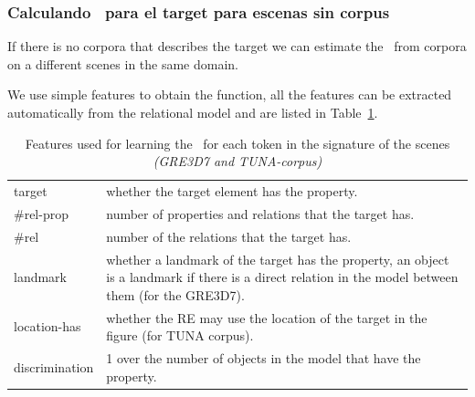 \subsubsection{Calculando \puse\ para el target para escenas sin corpus } \label{subsec:learning}

If there is no corpora that describes the target we can estimate the
\puse~from corpora on a different scenes in the same domain.

We use simple features to obtain the function, all the features can be
extracted automatically from the relational model and are listed in
Table~\ref{features}.

\begin{small}
\begin{table}[h!]
\begin{center}
\begin{tabular}{|l|p{10cm}|}
\hline
target & whether the target element has the property. \\
\#rel-prop & number of properties and relations that the target has.\\
\#rel & number of the relations that the target has. \\
landmark & whether a landmark of the target has the property, an object is a landmark if there is a direct relation in the model 
between them (for the GRE3D7).\\
location-has & whether the RE may use the location of the target in the figure (for TUNA corpus).\\
discrimination & 1 over the number of objects in the model that have the property.  \\
\hline
\end{tabular}
\caption{Features used for learning the \puse~for each token in the signature of the scenes \textit{(GRE3D7 and TUNA-corpus)} \label{features}}
\end{center}
\end{table}
\end{small}

